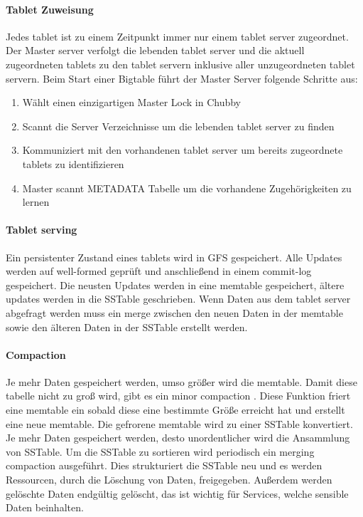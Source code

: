 \paragraph{Tablet Zuweisung}
Jedes tablet ist zu einem Zeitpunkt immer nur einem tablet server zugeordnet. Der Master server verfolgt die lebenden tablet server und die aktuell zugeordneten tablets zu den tablet servern inklusive aller unzugeordneten tablet servern.
Beim Start einer Bigtable führt der Master Server folgende Schritte aus:

\begin{enumerate}
	\item Wählt einen einzigartigen Master Lock in Chubby
	\item Scannt die Server Verzeichnisse um die lebenden tablet server zu finden
	\item Kommuniziert mit den vorhandenen tablet server um bereits zugeordnete tablets zu identifizieren
	\item Master scannt METADATA Tabelle um die vorhandene Zugehörigkeiten zu lernen
\end{enumerate}

\paragraph{Tablet serving}
Ein persistenter Zustand eines tablets wird in GFS gespeichert. Alle Updates werden auf \glqq well-formed \grqq geprüft und anschließend in einem commit-log gespeichert. Die neusten Updates werden in eine memtable gespeichert, ältere updates werden in die SSTable geschrieben. Wenn Daten aus dem tablet server abgefragt werden muss ein merge zwischen den neuen Daten in der memtable sowie den älteren Daten in der SSTable erstellt werden.

\paragraph{Compaction}
Je mehr Daten gespeichert werden, umso größer wird die memtable. Damit diese tabelle nicht zu groß wird, gibt es ein \glqq minor compaction \grqq. Diese Funktion friert eine memtable ein sobald diese eine bestimmte Größe erreicht hat und erstellt eine neue memtable. Die gefrorene memtable wird zu einer SSTable konvertiert. Je mehr Daten gespeichert werden, desto unordentlicher wird die Ansammlung von SSTable. Um die SSTable zu sortieren wird periodisch ein \glqq merging compaction \grqq ausgeführt. Dies strukturiert die SSTable neu und es werden Ressourcen, durch die Löschung von Daten, freigegeben. Außerdem werden gelöschte Daten endgültig gelöscht, das ist wichtig für Services, welche sensible Daten beinhalten.

